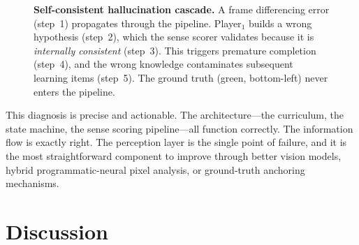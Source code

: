 \documentclass[11pt,letterpaper]{article}
\begin{document}
\begin{figure}[t]
{%
  }
  \caption{\textbf{Self-consistent hallucination cascade.} A frame differencing error (step~1) propagates through the pipeline. Player$_1$ builds a wrong hypothesis (step~2), which the sense scorer validates because it is \emph{internally consistent} (step~3). This triggers premature completion (step~4), and the wrong knowledge contaminates subsequent learning items (step~5). The ground truth (green, bottom-left) never enters the pipeline.}
  \label{fig:cascade}
\end{figure}

This diagnosis is precise and actionable. The architecture---the curriculum, the state machine, the sense scoring pipeline---all function correctly. The information flow is exactly right. The perception layer is the single point of failure, and it is the most straightforward component to improve through better vision models, hybrid programmatic-neural pixel analysis, or ground-truth anchoring mechanisms.


\section{Discussion}
\label{sec:discussion}
\end{document}

